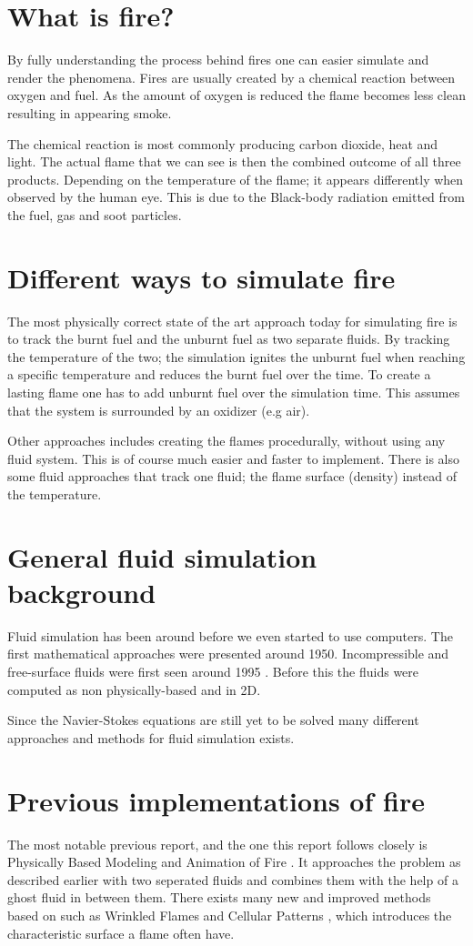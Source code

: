 \section{What is fire?}
By fully understanding the process behind fires one can easier simulate and render the phenomena. Fires are usually created by a chemical reaction between oxygen and fuel. As the amount of oxygen is reduced the flame becomes less clean resulting in appearing smoke. 

The chemical reaction is most commonly producing carbon dioxide, heat and light. The actual flame that we can see is then the combined outcome of all three products. Depending on the temperature of the flame; it appears differently when observed by the human eye. This is due to the Black-body radiation emitted from the fuel, gas and soot particles.

\section{Different ways to simulate fire}
The most physically correct state of the art approach today for simulating fire is to track the burnt fuel and the unburnt fuel as two separate fluids. By tracking the temperature of the two; the simulation ignites the unburnt fuel when reaching a specific temperature and reduces the burnt fuel over the time. To create a lasting flame one has to add unburnt fuel over the simulation time. This assumes that the system is surrounded by an oxidizer (e.g air).

Other approaches includes creating the flames procedurally, without using any fluid system. This is of course much easier and faster to implement. There is also some fluid approaches that track one fluid; the flame surface (density) instead of the temperature.

\section{General fluid simulation background}
Fluid simulation has been around before we even started to use computers. The first mathematical approaches were presented around 1950. Incompressible and free-surface fluids were first seen around 1995 \cite{foster}. Before this the fluids were computed as non physically-based and in 2D.

Since the Navier-Stokes equations are still yet to be solved many different approaches and methods for fluid simulation exists.

\section{Previous implementations of fire}
The most notable previous report, and the one this report follows closely is Physically Based Modeling and Animation of Fire \cite{Nguyen02}. It approaches the problem as described earlier with two seperated fluids and combines them with the help of a ghost fluid in between them. There exists many new and improved methods based on \cite{Nguyen02} such as Wrinkled Flames and Cellular Patterns \cite{wrinkled}, which introduces the characteristic surface a flame often have.
